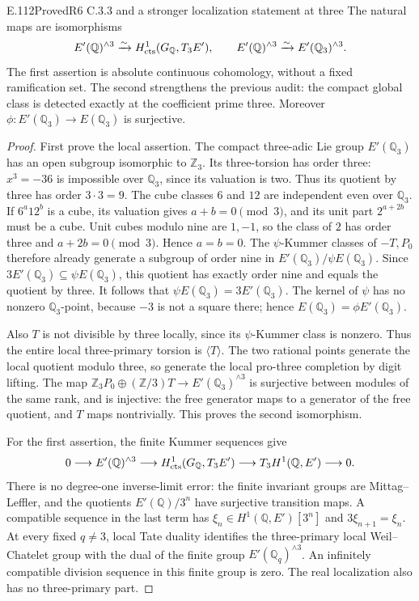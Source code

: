 \begin{result}{E.112}{Proved}{R6 C.3.3 and a stronger localization statement at three}
The natural maps are isomorphisms
\[
 E'(\mathbb Q)^{\wedge3}
 \xrightarrow{\sim}H^1_{\rm cts}(G_{\mathbb Q},T_3E'),
 \qquad
 E'(\mathbb Q)^{\wedge3}
 \xrightarrow{\sim}E'(\mathbb Q_3)^{\wedge3}.
\]
The first assertion is absolute continuous cohomology, without a
fixed ramification set. The second strengthens the previous audit:
the compact global class is detected exactly at the coefficient prime
three. Moreover $\phi:E'(\mathbb Q_3)\to E(\mathbb Q_3)$ is
surjective.
\end{result}
\begin{proof}
First prove the local assertion. The compact three-adic Lie group
$E'(\mathbb Q_3)$ has an open subgroup isomorphic to $\mathbb Z_3$.
Its three-torsion has order three: $x^3=-36$ is impossible over
$\mathbb Q_3$, since its valuation is two. Thus its quotient by
three has order $3\cdot3=9$. The cube classes $6$ and $12$ are
independent even over $\mathbb Q_3$. If $6^a12^b$ is a cube, its
valuation gives $a+b=0\pmod3$, and its unit part $2^{a+2b}$ must
be a cube. Unit cubes modulo nine are $1,-1$, so the class of $2$
has order three and $a+2b=0\pmod3$. Hence $a=b=0$.
The $\psi$-Kummer classes of $-T,P_0$ therefore already generate
a subgroup of order nine in $E'(\mathbb Q_3)/\psi E(\mathbb Q_3)$.
Since $3E'(\mathbb Q_3)\subseteq\psi E(\mathbb Q_3)$, this
quotient has exactly order nine and equals the quotient by three.
It follows that $\psi E(\mathbb Q_3)=3E'(\mathbb Q_3)$.
The kernel of $\psi$ has no nonzero $\mathbb Q_3$-point, because
$-3$ is not a square there; hence
$E(\mathbb Q_3)=\phi E'(\mathbb Q_3)$.

Also $T$ is not divisible by three locally, since its $\psi$-Kummer
class is nonzero. Thus the entire local three-primary torsion is
$\langle T\rangle$. The two rational points generate the local
quotient modulo three, so generate the local pro-three completion
by digit lifting. The map
$\mathbb Z_3P_0\oplus(\mathbb Z/3)T\to E'(\mathbb Q_3)^{\wedge3}$
is surjective between modules of the same rank, and is injective:
the free generator maps to a generator of the free quotient, and
$T$ maps nontrivially. This proves the second isomorphism.

For the first assertion, the finite Kummer sequences give
\[
 0\longrightarrow E'(\mathbb Q)^{\wedge3}
 \longrightarrow H^1_{\rm cts}(G_{\mathbb Q},T_3E')
 \longrightarrow T_3H^1(\mathbb Q,E')\longrightarrow0.
\]
There is no degree-one inverse-limit error: the finite invariant
groups are Mittag--Leffler, and the quotients $E'(\mathbb Q)/3^n$
have surjective transition maps. A compatible sequence in the last
term has $\xi_n\in H^1(\mathbb Q,E')[3^n]$ and
$3\xi_{n+1}=\xi_n$. At every fixed $q\ne3$, local Tate duality
identifies the three-primary local Weil--Chatelet group with the
dual of the finite group $E'(\mathbb Q_q)^{\wedge3}$.
An infinitely compatible division sequence in this finite group is
zero. The real localization also has no three-primary part.


\end{proof}

